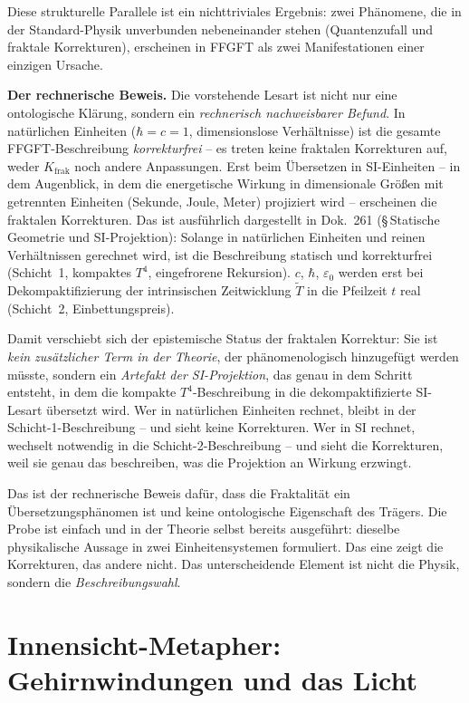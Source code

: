 Diese strukturelle Parallele ist ein nichttriviales Ergebnis: zwei
Phänomene, die in der Standard-Physik unverbunden nebeneinander
stehen (Quantenzufall und fraktale Korrekturen), erscheinen in
FFGFT als zwei Manifestationen einer einzigen Ursache.

\textbf{Der rechnerische Beweis.} Die vorstehende Lesart ist nicht
nur eine ontologische Klärung, sondern ein \emph{rechnerisch
nachweisbarer Befund}. In natürlichen Einheiten ($\hbar = c = 1$,
dimensionslose Verhältnisse) ist die gesamte FFGFT-Beschreibung
\emph{korrekturfrei} -- es treten keine fraktalen Korrekturen auf,
weder $K_{\text{frak}}$ noch andere Anpassungen. Erst beim
Übersetzen in SI-Einheiten -- in dem Augenblick, in dem die
energetische Wirkung in dimensionale Größen mit getrennten
Einheiten (Sekunde, Joule, Meter) projiziert wird -- erscheinen die
fraktalen Korrekturen. Das ist ausführlich dargestellt in
Dok.~261 (§\,Statische Geometrie und SI-Projektion): Solange in
natürlichen Einheiten und reinen Verhältnissen gerechnet wird, ist
die Beschreibung statisch und korrekturfrei (Schicht~1, kompaktes
$T^4$, eingefrorene Rekursion). $c$, $\hbar$, $\varepsilon_0$
werden erst bei Dekompaktifizierung der intrinsischen Zeitwicklung
$\tilde T$ in die Pfeilzeit $t$ real (Schicht~2, Einbettungspreis).

Damit verschiebt sich der epistemische Status der fraktalen
Korrektur: Sie ist \emph{kein zusätzlicher Term in der Theorie}, der
phänomenologisch hinzugefügt werden müsste, sondern ein
\emph{Artefakt der SI-Projektion}, das genau in dem Schritt
entsteht, in dem die kompakte $T^4$-Beschreibung in die
dekompaktifizierte SI-Lesart übersetzt wird. Wer in natürlichen
Einheiten rechnet, bleibt in der Schicht-1-Beschreibung -- und sieht
keine Korrekturen. Wer in SI rechnet, wechselt notwendig in die
Schicht-2-Beschreibung -- und sieht die Korrekturen, weil sie genau
das beschreiben, was die Projektion an Wirkung erzwingt.

Das ist der rechnerische Beweis dafür, dass die Fraktalität ein
Übersetzungsphänomen ist und keine ontologische Eigenschaft des
Trägers. Die Probe ist einfach und in der Theorie selbst bereits
ausgeführt: dieselbe physikalische Aussage in zwei Einheitensystemen
formuliert. Das eine zeigt die Korrekturen, das andere nicht. Das
unterscheidende Element ist nicht die Physik, sondern die
\emph{Beschreibungswahl}.

\section{Innensicht-Metapher: Gehirnwindungen und das Licht}

